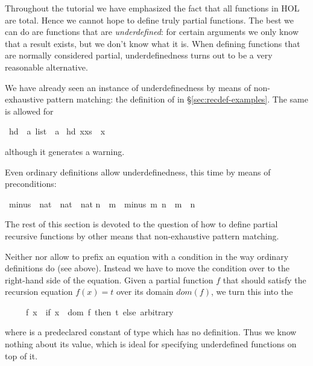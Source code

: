 %
\begin{isabellebody}%
\def\isabellecontext{Partial}%
%
\begin{isamarkuptext}%
\noindent
Throughout the tutorial we have emphasized the fact that all functions
in HOL are total. Hence we cannot hope to define truly partial
functions. The best we can do are functions that are
\emph{underdefined}:
for certain arguments we only know that a result
exists, but we don't know what it is. When defining functions that are
normally considered partial, underdefinedness turns out to be a very
reasonable alternative.

We have already seen an instance of underdefinedness by means of
non-exhaustive pattern matching: the definition of  in
\S\ref{sec:recdef-examples}. The same is allowed for %
\end{isamarkuptext}%
\ hd\ {\isacharcolon}{\isacharcolon}\ {\isachardoublequote}{\isacharprime}a\ list\ {\isasymRightarrow}\ {\isacharprime}a{\isachardoublequote}\isanewline
{}\ {\isachardoublequote}hd\ {\isacharparenleft}x{\isacharhash}xs{\isacharparenright}\ {\isacharequal}\ x{\isachardoublequote}%
\begin{isamarkuptext}%
\noindent
although it generates a warning.

Even ordinary definitions allow underdefinedness, this time by means of
preconditions:%
\end{isamarkuptext}%
\ minus\ {\isacharcolon}{\isacharcolon}\ {\isachardoublequote}nat\ {\isasymRightarrow}\ nat\ {\isasymRightarrow}\ nat{\isachardoublequote}\isanewline
{\isachardoublequote}n\ {\isasymle}\ m\ {\isasymLongrightarrow}\ minus\ m\ n\ {\isasymequiv}\ m\ {\isacharminus}\ n{\isachardoublequote}%
\begin{isamarkuptext}%
The rest of this section is devoted to the question of how to define
partial recursive functions by other means that non-exhaustive pattern
matching.%
\end{isamarkuptext}%
%
%
\begin{isamarkuptext}%
Neither  nor  allow to
prefix an equation with a condition in the way ordinary definitions do
(see  above). Instead we have to move the condition over
to the right-hand side of the equation. Given a partial function $f$
that should satisfy the recursion equation $f(x) = t$ over its domain
$dom(f)$, we turn this into the 
\begin{isabelle}%
\ \ \ \ \ f\ x\ {\isacharequal}\ {\isacharparenleft}if\ x\ {\isasymin}\ dom\ f\ then\ t\ else\ arbitrary{\isacharparenright}%
\end{isabelle}
where  is a predeclared constant of type 
which has no definition. Thus we know nothing about its value,
which is ideal for specifying underdefined functions on top of it.


\end{isamarkuptext}
\end{isabellebody}
